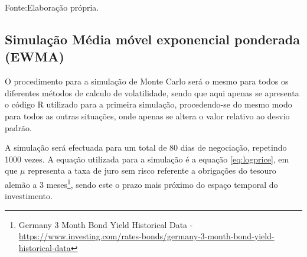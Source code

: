 \documentclass[
  12pt,
  a4paper,
  openany]{book}
\theoremstyle{definition}
\theoremstyle{definition}
\theoremstyle{definition}
\theoremstyle{remark}
\begin{document}
Fonte:Elaboração própria.

\justifying
\bigskip

\hypertarget{simulauxe7uxe3o-muxe9dia-muxf3vel-exponencial-ponderada-ewma}{%
\subsection{Simulação Média móvel exponencial ponderada (EWMA)}\label{simulauxe7uxe3o-muxe9dia-muxf3vel-exponencial-ponderada-ewma}}

O procedimento para a simulação de Monte Carlo será o mesmo para todos os diferentes métodos de calculo de volatilidade, sendo que aqui apenas se apresenta o código R utilizado para a primeira simulação, procedendo-se do mesmo modo para todos as outras situações, onde apenas se altera o valor relativo ao desvio padrão.

A simulação será efectuada para um total de 80 dias de negociação, repetindo 1000 vezes. A equação utilizada para a simulação é a equação \eqref{eq:logprice}, em que \(\mu\) representa a taxa de juro sem risco referente a obrigações do tesouro alemão a 3 meses\footnote{Germany 3 Month Bond Yield Historical Data - \url{https://www.investing.com/rates-bonds/germany-3-month-bond-yield-historical-data}}, sendo este o prazo mais próximo do espaço temporal do investimento.

\scriptsize
\end{document}
